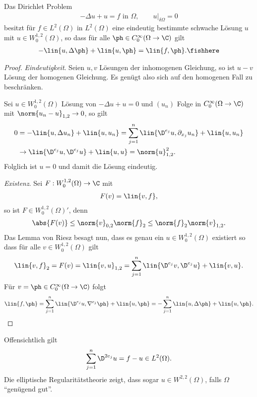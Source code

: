 \begin{prop}
\label{prop:7.35}
Das Dirichlet Problem
\begin{align*}
-\Delta u + u = f\text{ in }\Omega,\qquad u\big|_{\delta \Omega} = 0
\end{align*}
besitzt für $f\in L^2(\Omega)$ in $L^2(\Omega)$ eine eindeutig bestimmte
schwache Lösung $u$ mit $u\in W_0^{1,2}(\Omega)$, so dass für alle $\ph\in
C_0^\infty(\Omega\to\C)$ gilt
\begin{align*}
-\lin{u,\Delta \ph} + \lin{u,\ph} = \lin{f,\ph}.\fishhere
\end{align*}
\end{prop}
\begin{proof}
\textit{Eindeutigkeit}.
Seien $u,v$ Lösungen der inhomogenen Gleichung, so ist $u-v$ Lösung der
homogenen Gleichung. Es genügt also sich auf den homogenen Fall zu beschränken.

Sei $u\in W_0^{1,2}(\Omega)$ Lösung von $-\Delta u + u = 0$ und $(u_n)$
Folge in $C_0^\infty(\Omega\to\C)$ mit $\norm{u_n-u}_{1,2}\to 0$, so gilt
\begin{align*}
0 &= -\lin{u,\Delta u_n} + \lin{u,u_n} = \sum_{j=1}^n
\lin{\D^{e_j}u,\partial_{x_j}u_n} + \lin{u,u_n}\\
&\to \lin{\D^{e_j}u,\D^{e_j}u} + \lin{u,u} = \norm{u}_{1,2}^2.
\end{align*}
Folglich ist $u=0$ und damit die Lösung eindeutig.

\textit{Existenz}. Sei $F: W_0^{1,2}(\Omega)\to \C$ mit
\begin{align*}
F(v) = \lin{v,f},
\end{align*}
so ist $F\in  W_0^{1,2}(\Omega)'$, denn
\begin{align*}
\abs{F(v)} \le \norm{v}_{0,2}\norm{f}_2 \le \norm{f}_2 \norm{v}_{1,2}.
\end{align*}
Das Lemma von Riesz besagt nun, dass es genau ein $u\in W_0^{1,2}(\Omega)$
existiert so dass für alle $v\in W_0^{1,2}(\Omega)$ gilt
\begin{align*}
\lin{v,f}_2 = F(v) = \lin{v,u}_{1,2}
= \sum_{j=1}^n \lin{\D^{e_j}v,\D^{e_j}u} + \lin{v,u}.
\end{align*}
Für $v=\ph\in C_0^\infty(\Omega\to\C)$ folgt
\begin{align*}
\lin{f,\ph} = \sum_{j=1}^n \lin{\D^{e_j}u,\nabla^{e_j}\ph} + \lin{u,\ph}
= -\sum_{j=1}^n \lin{u,\Delta\ph} + \lin{u,\ph}.\qedhere
\end{align*}
\end{proof}

\begin{bem}
\label{bem:7.36}
Offensichtlich gilt
\begin{align*}
\sum_{j=1}^n \D^{2e_j}u = f-u \in L^2(\Omega).
\end{align*}
Die elliptische Regularitätstheorie zeigt, dass sogar $u\in W^{2,2}(\Omega)$,
falls $\Omega$ ``genügend gut''.\maphere
\end{bem}

